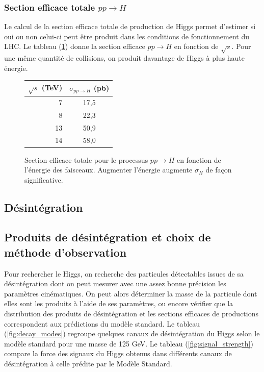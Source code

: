 \documentclass[11pt]{article} %
\begin{document}
\subsubsection{Section efficace totale $pp \to H$}

Le calcul de la section efficace totale de production de Higgs permet d'estimer si oui ou non celui-ci peut être produit dans les conditions de fonctionnement du LHC. Le tableau (\ref{fig:xs_h}) donne la section efficace $pp\to H$ en fonction de $\sqrt{s}$. Pour une même quantité de collisions, on produit davantage de Higgs à plus haute énergie.

\begin{figure}[H]
      \centering
\begin{tabular}{|r|c|} 
   \hline
   $\sqrt{s}$ (TeV) & $\sigma_{pp \to H}$ (pb) \\
    \hline
   7 &  17,5\\
\hline
   8 & 22,3 \\
\hline
   13 & 50,9  \\
\hline
   14 & 58,0 \\
  \hline
\end{tabular}

\caption{\label{fig:xs_h}Section efficace totale pour le processus $pp \to H$ en fonction de l'énergie des faisceaux. Augmenter l'énergie augmente $\sigma_H$ de façon significative.}
\end{figure}

\subsection{Désintégration}


\subsection{Produits de désintégration et choix de méthode d'observation}

Pour rechercher le Higgs, on recherche des particules détectables issues de sa désintégration dont on peut mesurer avec une assez bonne précision les paramètres cinématiques. On peut alors déterminer la masse de la particule dont elles sont les produits à l'aide de ses paramètres, ou encore vérifier que la distribution des produits de désintégration et les sections efficaces de productions correspondent aux prédictions du modèle standard. Le tableau (\ref{fig:decay_modes}) regroupe quelques canaux de désintégration du Higgs selon le modèle standard pour une masse de 125 GeV. Le tableau (\ref{fig:signal_strength}) compare la force des signaux du Higgs obtenus dans différents canaux de désintégration à celle prédite par le Modèle Standard.
\end{document}
